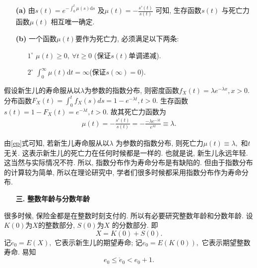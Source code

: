 \documentclass[a4paper,10pt]{ctexbook}
\newcommand{\hei}{\CJKfamily{hei}}      %
\begin{document}
\begin{remark}
    \begin{enumerate}
        \item[{\bf(a)}] 由$s(t) = e^{-\int_{0}^{t}\mu(s)\mathrm{d}s}$ 及$ \mu(t) = -\frac{s'(t)}{s(t)}$ 可知, 生存函数$s(t)$ 与死亡力函数$\mu(t)$ 相互唯一确定.
        \item[{\bf(b)}] 一个函数$\mu(t)$要作为死亡力, 必须满足以下两条:
            \begin{enumerate}
                \item[ $ 1^\circ$] $\mu(t) \geq 0, ~\forall t \geq 0$ (保证$s(t)$单调递减).
                \item[$2^\circ$] $\int_0^{\infty}\mu(t)\mathrm{d}t = \infty$(保证$s(\infty)=0$).
            \end{enumerate}
    \end{enumerate}

\end{remark}




\begin{example}
    假设新生儿的寿命服从以$\lambda$为参数的指数分布, 则密度函数$f_X(t)=\lambda e^{-\lambda x},x>0.$ 分布函数$F_X(t)=\int_0^t f_X(s)ds=1-e^{-\lambda t}, t>0.$ 生存函数$s(t)=1-F_X(t)=e^{-\lambda t},t>0.$  故其死亡力函数为
    \begin{align}\label{ep}
        \mu(t)=-\frac{s'(t)}{s(t)}=-\frac{-\lambda e^{-\lambda t}}{e^{\lambda t}}\equiv\lambda.
    \end{align}
\end{example}

\begin{remark}
    由\eqref{ep}式可知, 若新生儿寿命服从以$\lambda$ 为参数的指数分布, 则死亡力$\mu(t)\equiv \lambda,$ 和$t$ 无关. 这表示新生儿的死亡力在任何时候都是一样的. 也就是说, 新生儿永远年轻. 这当然与实际情况不符. 所以, 指数分布作为寿命分布是有缺陷的. 但由于指数分布的计算较为简单, 所以在理论研究中, 学者们很多时候都采用指数分布作为寿命分布.
\end{remark}
\begin{itemize}
    \item[{\bf\hei 三.}]{\hei\bf 整数年龄与分数年龄}
\end{itemize}
很多时候, 保险金都是在整数时刻支付的. 所以有必要研究整数年龄和分数年龄. 设$K(0)$为$X$的整数部分, $S(0)$为$X$ 的分数部分. 即
$$X = K(0) + S(0).$$
记$\mathring{e}_0 = E(X),$ 它表示新生儿的期望寿命; 记$e_0 = E(K(0)),$ 它表示期望整数寿命. 易知
\begin{equation*}
    e_0 \le \mathring{e}_0 < e_0 + 1.
\end{equation*}
\end{document}
